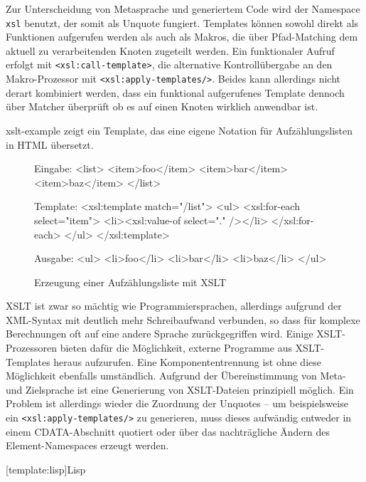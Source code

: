 \documentclass[12pt, a4paper, bibgerm]{scrbook}
\newenvironment{DIFnomarkup}{}{}
\newcommand\icode[1]{\lstinline?#1?}
\newcommand\lsection{}
\newcommand\abb{}
\begin{document}
Zur Unterscheidung von Metasprache und generiertem Code wird der
Namespace \icode{xsl} benutzt, der somit als Unquote fungiert. Templates
können sowohl direkt als Funktionen aufgerufen werden als auch als Makros,
die über Pfad-Matching dem aktuell zu verarbeitenden Knoten zugeteilt
werden. Ein funktionaler Aufruf erfolgt mit \icode{<xsl:call-template>},
die alternative Kontrollübergabe an den Makro-Prozessor mit
\icode{<xsl:apply-templates/>}. Beides kann allerdings nicht derart
kombiniert werden, dass ein funktional aufgerufenes Template dennoch
über Matcher überprüft ob es auf einen Knoten wirklich anwendbar ist.

\abb{xslt-example} zeigt ein Template, das eine eigene Notation für
Aufzählungslisten in HTML übersetzt.
\begin{figure}
  \centering
  \begin{DIFnomarkup}\begin{code}
Eingabe:
<list>
  <item>foo</item>
  <item>bar</item>
  <item>baz</item>
</list>

Template:
<xsl:template match="/list">
  <ul>
    <xsl:for-each select="item">
      <li><xsl:value-of select="." /></li>
    </xsl:for-each>
  </ul>
</xsl:template>    

Ausgabe:
<ul>
  <li>foo</li>
  <li>bar</li>
  <li>baz</li>
</ul>
  \end{code}\end{DIFnomarkup} %
  \caption{Erzeugung einer Aufzählungsliste mit XSLT}
  \label{magicl:fig:xslt-example}
\end{figure}

XSLT ist zwar so mächtig wie Programmiersprachen, allerdings aufgrund
der XML-Syntax mit deutlich mehr Schreibaufwand verbunden, so dass für
komplexe Berechnungen oft auf eine andere Sprache zurückgegriffen
wird. Einige XSLT-Prozessoren bieten dafür die Möglichkeit, externe
Programme aus XSLT-Templates heraus aufzurufen. Eine Komponententrennung
ist ohne diese Möglichkeit ebenfalls umständlich. Aufgrund der
Übereinstimmung von Meta- und Zielsprache ist eine Generierung von
XSLT-Dateien prinzipiell möglich. Ein Problem ist allerdings wieder die
Zuordnung der Unquotes -- um beispielsweise ein
\icode{<xsl:apply-templates/>} zu generieren, muss dieses aufwändig
entweder in einem CDATA-Abschnitt quotiert oder über das nachträgliche
Ändern des Element-Namespaces erzeugt werden.

\lsection[template:lisp]{Lisp}
\end{document}
